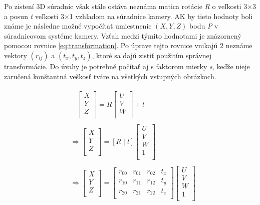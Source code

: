 \documentclass[slovak,master,dept460,male,cpp,cpdeclaration]{diploma}
\begin{document}
Po zistení 3D súradníc však stále ostáva neznáma matica rotácie \textit{R} o veľkosti 3$\times$3 a posun  \textit{t} veľkosti 3$\times$1 vzhľadom na súradnice kamery. AK by tieto hodnoty boli známe je následne možné vypočítať umiestnenie $(X, Y, Z)$ bodu \textit{P} v súradnicovom systéme kamery. Vzťah medzi týmito hodnotami je znázornený pomocou rovnice \ref{eq:transformation}. Po úprave tejto rovnice vnikajú 2 neznáme vektory $(r_{ij})$ a $(t_{x},t_{y},t_{z})$, ktoré sa dajú zistiť použitím správnej transformácie. Do úvahy je potrebné počítať aj s faktorom mierky \textit{s}, keďže nieje zaručená konštantná veškosť tváre na všetkých vstupných obrázkoch.


\begin{eqnarray}
\begin{split}
&\ \ \ \ \begin{bmatrix}
X\\ 
Y\\ 
Z\\
\end{bmatrix}
= R
\begin{bmatrix}
U\\ 
V\\ 
W\\ 
\end{bmatrix}
+ t
\\
\\
&\Rightarrow
\begin{bmatrix}
X\\ 
Y\\ 
Z\\
\end{bmatrix}
= \left[R \mid t\right]
\begin{bmatrix}
U\\ 
V\\ 
W\\
1\\
\end{bmatrix}
\\
\\
&\Rightarrow
\begin{bmatrix}
X\\ 
Y\\ 
Z\\
\end{bmatrix}
=
\begin{bmatrix}
r_{00} & r_{01} & r_{02} & t_{x}\\ 
r_{10} & r_{11} & r_{12} & t_{y}\\ 
r_{20} & r_{21} & r_{22} & t_{z}\\
\end{bmatrix}
\begin{bmatrix}
U\\ 
V\\ 
W\\
1\\
\end{bmatrix}
\label{eq:transformation}
\end{split}
\end{eqnarray}
\end{document}
